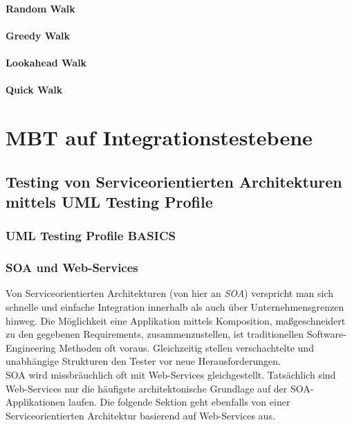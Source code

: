 \paragraph{Random Walk}
\paragraph{Greedy Walk}
\paragraph{Lookahead Walk}
\paragraph{Quick Walk}


\section{MBT auf Integrationstestebene}
\subsection{Testing von Serviceorientierten Architekturen mittels UML Testing Profile}
\label{sec:utp}
\subsubsection{UML Testing Profile BASICS}

\subsubsection{SOA und Web-Services}
Von Serviceorientierten Architekturen (von hier an \textit{SOA}) verspricht man sich schnelle und einfache Integration innerhalb als auch über Unternehmensgrenzen hinweg. Die Möglichkeit eine Applikation mittels Komposition, maßgeschneidert zu den gegebenen Requirements, zusammenzustellen, ist traditionellen Software-Engineering Methoden oft voraus. Gleichzeitig stellen verschachtelte und unabhängige Strukturen den Tester vor neue Herausforderungen. \\
SOA wird missbräuchlich oft mit Web-Services gleichgestellt. Tatsächlich sind Web-Services nur die häufigste architektonische Grundlage auf der SOA-Applikationen laufen. Die folgende Sektion geht ebenfalls von einer Serviceorientierten Architektur basierend auf Web-Services aus.

